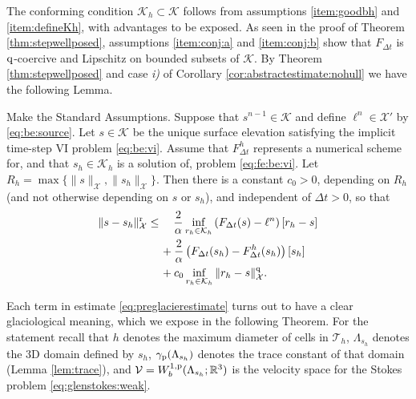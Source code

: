 \documentclass[hidelinks,onefignum,onetabnum,final]{siamart220329}  %
\newcommand{\RR}{\mathbb{R}}
\newcommand{\cK}{\mathcal{K}}
\newcommand{\cT}{\mathcal{T}}
\newcommand{\cV}{\mathcal{V}}
\newcommand{\cX}{\mathcal{X}}
\newcommand{\pp}{{\text{\textnormal{p}}}}
\newcommand{\qq}{{\text{\textnormal{q}}}}
\newcommand{\rr}{{\text{\textnormal{r}}}}
\begin{document}
\medskip
The conforming condition $\cK_h\subset \cK$ follows from assumptions \ref{item:goodbh} and \ref{item:defineKh}, with advantages to be exposed.  As seen in the proof of Theorem \ref{thm:stepwellposed}, assumptions \ref{item:conj:a} and \ref{item:conj:b} show that $F_{\Delta t}$ is $\qq$-coercive and Lipschitz on bounded subsets of $\cK$.  By Theorem \ref{thm:stepwellposed} and case \emph{i)} of Corollary \ref{cor:abstractestimate:nohull} we have the following Lemma.

\begin{lemma} \label{lem:preglacierapp}  Make the Standard Assumptions.  Suppose that $s^{n-1}\in\cK$ and define $\ell^n \in \cX'$ by \eqref{eq:be:source}.  Let $s\in\cK$ be the unique surface elevation satisfying the implicit time-step VI problem \eqref{eq:be:vi}.  Assume that $F^h_{\Delta t}$ represents a numerical scheme for, and that $s_h\in\cK_h$ is a solution of, problem \eqref{eq:fe:be:vi}.  Let $R_h=\max\{\|s\|_\cX,\|s_h\|_\cX\}$.  Then there is a constant $c_0>0$, depending on $R_h$ (and not otherwise depending on $s$ or $s_h$), and independent of $\Delta t>0$, so that %
\begin{align}
\|s-s_h\|_\cX^\rr &\le \quad \frac{2}{\alpha} \inf_{r_h\in\cK_h} \left(F_{\Delta t}(s)-\ell^n\right)[r_h-s] \label{eq:preglacierestimate} \\
   &\quad\, + \frac{2}{\alpha} \left(F_{\Delta t}(s_h)-F^h_{\Delta t}(s_h)\right)[s_h] \notag \\
   &\quad\, + c_0 \inf_{r_h\in\cK_h} \|r_h - s\|_{\cX}^\qq. \notag
\end{align}
\end{lemma}

Each term in estimate \eqref{eq:preglacierestimate} turns out to have a clear glaciological meaning, which we expose in the following Theorem.  For the statement recall that $h$ denotes the maximum diameter of cells in $\cT_h$, $\Lambda_{s_h}$ denotes the 3D domain defined by $s_h$, $\gamma_\pp(\Lambda_{s_h})$ denotes the trace constant of that domain (Lemma \ref{lem:trace}), and $\cV=W_b^{1,\pp}(\Lambda_{s_h}; \RR^3)$ is the velocity space for the Stokes problem \eqref{eq:glenstokes:weak}.
\end{document}
